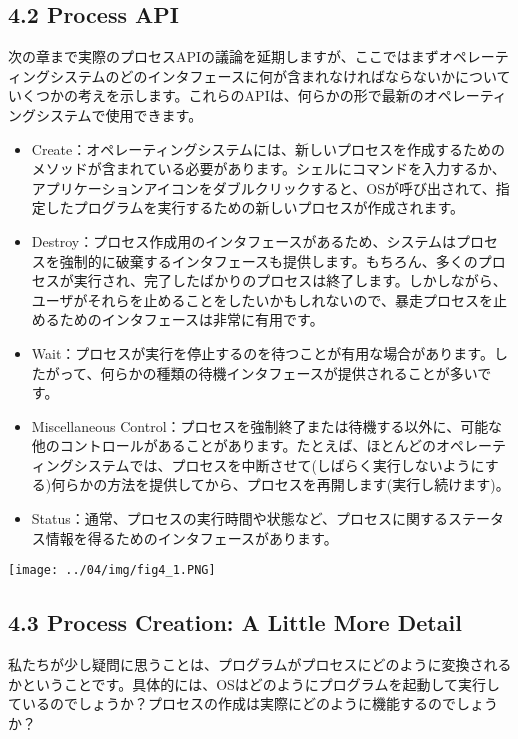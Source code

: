 \hypertarget{process-api}{%
\subsection*{4.2 Process API}\label{process-api}}

次の章まで実際のプロセスAPIの議論を延期しますが、ここではまずオペレーティングシステムのどのインタフェースに何が含まれなければならないかについていくつかの考えを示します。これらのAPIは、何らかの形で最新のオペレーティングシステムで使用できます。

\begin{itemize}
\item
  Create：オペレーティングシステムには、新しいプロセスを作成するためのメソッドが含まれている必要があります。シェルにコマンドを入力するか、アプリケーションアイコンをダブルクリックすると、OSが呼び出されて、指定したプログラムを実行するための新しいプロセスが作成されます。
\item
  Destroy：プロセス作成用のインタフェースがあるため、システムはプロセスを強制的に破棄するインタフェースも提供します。もちろん、多くのプロセスが実行され、完了したばかりのプロセスは終了します。しかしながら、ユーザがそれらを止めることをしたいかもしれないので、暴走プロセスを止めるためのインタフェースは非常に有用です。
\item
  Wait：プロセスが実行を停止するのを待つことが有用な場合があります。したがって、何らかの種類の待機インタフェースが提供されることが多いです。
\item
  Miscellaneous
  Control：プロセスを強制終了または待機する以外に、可能な他のコントロールがあることがあります。たとえば、ほとんどのオペレーティングシステムでは、プロセスを中断させて(しばらく実行しないようにする)何らかの方法を提供してから、プロセスを再開します(実行し続けます)。
\item
  Status：通常、プロセスの実行時間や状態など、プロセスに関するステータス情報を得るためのインタフェースがあります。
\end{itemize}

\texttt{[image: ../04/img/fig4\_1.PNG]}

\hypertarget{process-creation-a-little-more-detail}{%
\subsection*{4.3 Process Creation: A Little More
Detail}\label{process-creation-a-little-more-detail}}

私たちが少し疑問に思うことは、プログラムがプロセスにどのように変換されるかということです。具体的には、OSはどのようにプログラムを起動して実行しているのでしょうか？プロセスの作成は実際にどのように機能するのでしょうか？

